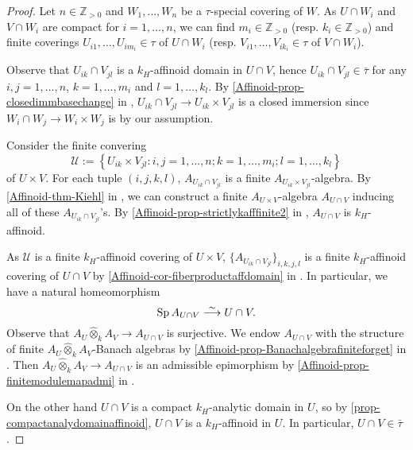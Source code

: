 \begin{proof}
    Let $n\in \mathbb{Z}_{>0}$ and $W_1,\ldots,W_n$ be a $\tau$-special covering of $W$.
    As $U\cap W_i$ and $V\cap W_i$ are compact for $i=1,\ldots,n$, we can find $m_i\in \mathbb{Z}_{>0}$ (resp. $k_i\in \mathbb{Z}_{>0}$) and finite coverings $U_{i1},\ldots,U_{im_i}\in \tau$ of $U\cap W_i$ (resp. $V_{i1},\ldots,V_{ik_i}\in \tau$ of $V\cap W_i$). 

    Observe that $U_{ik}\cap V_{jl}$ is a $k_H$-affinoid domain in $U\cap V$, hence $U_{ik}\cap V_{jl}\in \bar{\tau}$ for any $i,j=1,\ldots,n$, $k=1,\ldots,m_i$ and $l=1,\ldots,k_l$. By \cref{Affinoid-prop-closedimmbasechange} in , $U_{ik}\cap V_{jl}\rightarrow U_{ik}\times V_{jl}$ is a closed immersion since $W_i\cap W_j\rightarrow W_i\times W_j$ is by our assumption. 
    
    Consider the finite convering 
    \[
        \mathcal{U}:=\left\{U_{ik}\times V_{jl}:i,j=1,\ldots,n; k=1,\ldots,m_i; l=1,\ldots,k_l \right\}
    \]
    of $U\times V$. For each tuple $(i,j,k,l)$, $A_{U_{ik}\cap V_{jl}}$ is a finite $A_{U_{ik}\times V_{jl}}$-algebra. By \cref{Affinoid-thm-Kiehl} in , we can construct a finite $A_{U\times V}$-algebra $A_{U\cap V}$ inducing all of these $A_{U_{ik}\cap V_{jl}}$'s. By \cref{Affinoid-prop-strictlykafffinite2} in , $A_{U\cap V}$ is $k_H$-affinoid.

    As $\mathcal{U}$ is a finite $k_H$-affinoid covering of $U\times V$, $\{A_{U_{ik}\cap V_{jl}}\}_{i,k,j,l}$ is a finite $k_H$-affinoid covering of $U\cap V$ by \cref{Affinoid-cor-fiberproductaffdomain} in .
    In particular, we have a natural homeomorphism
    \[
        \operatorname{Sp} A_{U\cap V}\stackrel{\sim}{\longrightarrow} U\cap V.  
    \]
    Observe that $A_U\hat{\otimes}_k A_V \rightarrow A_{U\cap V}$ is surjective. We endow $A_{U\cap V}$ with the structure of finite $A_U\hat{\otimes}_k A_V$-Banach algebras by \cref{Affinoid-prop-Banachalgebrafiniteforget} in . Then $A_U\hat{\otimes}_k A_V \rightarrow A_{U\cap V}$ is an admissible epimorphism by \cref{Affinoid-prop-finitemodulemapadmi} in .

    On the other hand $U\cap V$ is a compact $k_H$-analytic domain in $U$, so by \cref{prop-compactanalydomainaffinoid}, $U\cap V$ is a $k_H$-affinoid in $U$. In particular, $U\cap V\in \bar{\tau}$.
\end{proof}

